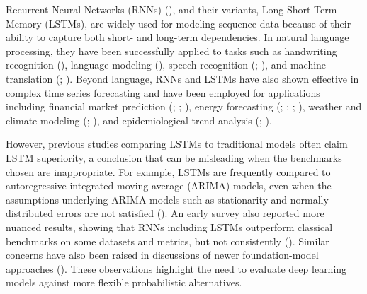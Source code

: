 \documentclass[
  letterpaper,
  double,
  12pt,
  1.0in]{beavtex}
\begin{document}
Recurrent Neural Networks (RNNs)
(), and their variants, Long Short-Term Memory (LSTMs), are widely
used for modeling sequence data because of their ability to capture both
short- and long-term dependencies. In natural language processing, they
have been successfully applied to tasks such as handwriting recognition
(), language modeling
(), speech
recognition (;
), and machine
translation (; ). Beyond language, RNNs and LSTMs have also shown effective in
complex time series forecasting and have been employed for applications
including financial market prediction
(; ;
), energy
forecasting (; ;
;
), weather and
climate modeling (;
), and epidemiological trend
analysis (;
).

However, previous studies comparing LSTMs to traditional models often
claim LSTM superiority, a conclusion that can be misleading when the
benchmarks chosen are inappropriate. For example, LSTMs are frequently
compared to autoregressive integrated moving average (ARIMA) models,
even when the assumptions underlying ARIMA models such as stationarity
and normally distributed errors are not satisfied
(). An early survey also reported more nuanced results,
showing that RNNs including LSTMs outperform classical benchmarks on
some datasets and metrics, but not consistently
(). Similar concerns have also been raised in discussions of
newer foundation-model approaches
(). These
observations highlight the need to evaluate deep learning models against
more flexible probabilistic alternatives.
\end{document}
